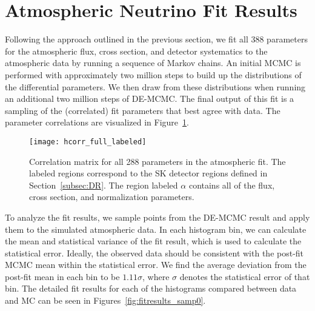 

\section{Atmospheric Neutrino Fit Results}
\label{sec:fitresults}

Following the approach outlined in the previous section, we fit all 388
parameters for the atmospheric flux, cross section, and detector systematics to
the atmospheric data by running a sequence of Markov chains.  An initial MCMC is
performed with approximately two million steps to build up the distributions of
the differential parameters.  We then draw from these distributions when running
an additional two million steps of DE-MCMC\@.  The final output of this fit is 
a sampling of the (correlated) fit parameters that best agree with data. The parameter
correlations are visualized in Figure~\ref{fig:fitcorr}.

\begin{figure}[h]
  \begin{center}
    \texttt{[image: hcorr\_full\_labeled]}
  \end{center}
  \caption{Correlation matrix for all 288 parameters in the atmospheric fit.
  The labeled regions correspond to the SK detector regions defined in
  Section~\ref{subsec:DR}.  The region labeled $\alpha$ contains all of the
  flux, cross section, and normalization parameters.}
  \label{fig:fitcorr}
\end{figure}

To analyze the fit results, we
sample points from the DE-MCMC result and apply them to the simulated
atmospheric data\@.  In each histogram bin, we can calculate the mean and
statistical variance of the fit result, which is used to calculate the
statistical error.  Ideally, the observed data should be consistent with the
post-fit MCMC mean within the statistical error.  We find the average deviation
from the post-fit mean in each bin to be $1.11\sigma$, where $\sigma$ denotes
the statistical error of that bin.  The detailed fit results for each of the
histograms compared between data and MC can be seen in
Figures~\ref{fig:fitresults_samp0}.


